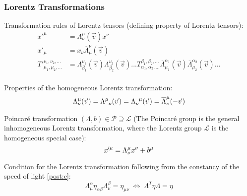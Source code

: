 		\subsubsection{Lorentz Transformations}
			\noindent
			Transformation rules of Lorentz tensors (defining property of Lorentz tensors):
			\begin{equation}
				\begin{aligned}
					{x'}^\mu &= \Lambda^{\mu}_{\nu}(\vec{v}) x^\nu \\
					{x'}_\mu &=  x_\nu \overline{\Lambda}_\mu^{\nu}(\vec{v}) \\
					{T'}_{\mu_1,\mu_2,...}^{\nu_1,\nu_2,...} &=  \Lambda^{\nu_1}_{\beta_1}(\vec{v}) \Lambda^{\nu_2}_{\beta_2}(\vec{v}) ... T_{\alpha_1,\alpha_2,...}^{\beta_1,\beta_2,...} \overline{\Lambda}_{\mu_1}^{\alpha_1}(\vec{v}) \overline{\Lambda}_{\mu_2}^{\alpha_2}(\vec{v}) ... \\
				\end{aligned}
			\end{equation}
			
			\noindent
			Properties of the homogeneous Lorentz transformation:
			\begin{equation}
				\Lambda^{\mu}_{\nu}(\vec{v}) = \Lambda^{\mu}_{\phantom{\mu}\nu}(\vec{v}) = \Lambda^{\phantom{\nu}\mu}_{\nu}(\vec{v}) = \overline{\Lambda}^{\mu}_{\nu}(-\vec{v}) \\
			\end{equation}

			\noindent
			Poincaré transformation $(\Lambda, b) \in\mathcal{P} \supseteq \mathcal{L}$ (The Poincaré group is the general inhomogeneous Lorentz transformation, where the Lorentz group $\mathcal{L}$ is the homogeneous special case): 
			\begin{equation}
				x'^\mu = \Lambda^\mu_{\nu} x^\nu + b^\mu \\				
			\end{equation}
			
			\noindent
			Condition for the Lorentz transformation following from the constancy of the speed of light \ref{post:c}:
			\begin{equation}
				\Lambda^{\alpha}_{\mu} \eta_{\alpha\beta} \Lambda^{\beta}_{\nu} = \eta_{\mu\nu}
				\;\Leftrightarrow\; \Lambda^T \eta \Lambda = \eta
			\end{equation}
			
